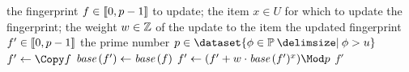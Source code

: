 \begin{algorithmic}[1]
  \In the fingerprint \( f \in \llbracket0, p - 1\rrbracket \) to update; the item \( x \in U \) for which to update the fingerprint; the weight \( w \in \mathbb{Z} \) of the update to the item
  \Out the updated fingerprint \( f' \in \llbracket0, p - 1\rrbracket \)
  \Constant the prime number \( p \in \dataset{\phi \in \primes \suchthat \phi > u} \)
    \State \( f' \gets \Copy f \)
    \State \( \base (f') \gets \base (f) \)
    \State \( f' \gets (f' + w \cdot \base (f')^{x}) \Mod p \)
    \State \Return \( f' \)
  \EndFunction
\end{algorithmic}
